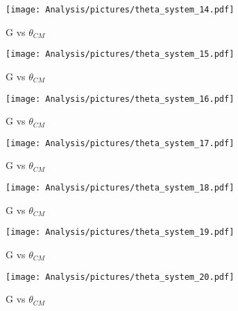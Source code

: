 \begin{figure}[htb]
  \begin{center}
    \texttt{[image: Analysis/pictures/theta\_system\_14.pdf]} \\
    \caption{G vs $\theta_{CM}$ }
    \label{fig:Gvstheta_W15}
  \end{center}
\end{figure}
\begin{figure}[htb]
  \begin{center}
    \texttt{[image: Analysis/pictures/theta\_system\_15.pdf]} \\
    \caption{G vs $\theta_{CM}$}
    \label{fig:Gvstheta_W16}
  \end{center}
\end{figure}
\begin{figure}[htb]
  \begin{center}
    \texttt{[image: Analysis/pictures/theta\_system\_16.pdf]} \\
    \caption{G vs $\theta_{CM}$ }
    \label{fig:Gvstheta_W17}
  \end{center}
\end{figure}
\begin{figure}[htb]
  \begin{center}
    \texttt{[image: Analysis/pictures/theta\_system\_17.pdf]} \\
    \caption{G vs $\theta_{CM}$ }
    \label{fig:Gvstheta_W18}
  \end{center}
\end{figure}
\begin{figure}[htb]
  \begin{center}
    \texttt{[image: Analysis/pictures/theta\_system\_18.pdf]} \\
    \caption{G vs $\theta_{CM}$ }
    \label{fig:Gvstheta_W19}
  \end{center}
\end{figure}
\begin{figure}[htb]
  \begin{center}
    \texttt{[image: Analysis/pictures/theta\_system\_19.pdf]} \\
    \caption{G vs $\theta_{CM}$ }
    \label{fig:Gvstheta_W20}
  \end{center}
\end{figure}
\begin{figure}[htb]
  \begin{center}
    \texttt{[image: Analysis/pictures/theta\_system\_20.pdf]} \\
    \caption{G vs $\theta_{CM}$}
    \label{fig:Gvstheta_W21}
  \end{center}
\end{figure}
